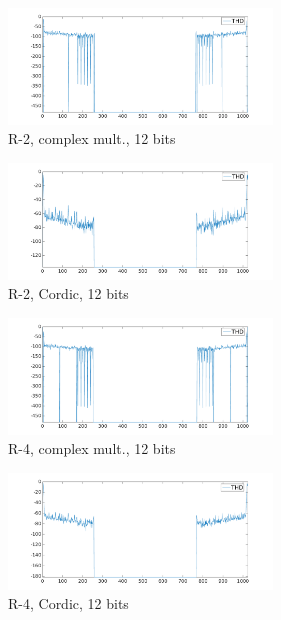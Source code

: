 \documentclass[conference]{IEEEtran}
\begin{document}
\begin{figure}[Htb!]
        \centering
        \includegraphics[width=7cm]{./figures/thd_r2_1024_12_mul.png}
        \caption{R-2, complex mult., 12 bits}
        \label{fig:r2_thd_1024_com}
\end{figure}

\begin{figure}[Htb!]
        \centering
        \includegraphics[width=7cm]{./figures/thd_r2_1024_12_cor.png}
        \caption{R-2, Cordic, 12 bits}
        \label{fig:r2_thd_1024_cor}
\end{figure}

\begin{figure}[Htb!]
        \centering
        \includegraphics[width=7cm]{./figures/thd_r4_1024_12_mul.png}
        \caption{R-4, complex mult., 12 bits}
        \label{fig:r4_thd_1024_com}
\end{figure}

\begin{figure}[Htb!]
        \centering
        \includegraphics[width=7cm]{./figures/thd_r4_1024_12_cor.png}
        \caption{R-4, Cordic, 12 bits}
        \label{fig:r4_thd_1024_cor}
\end{figure}
\end{document}
